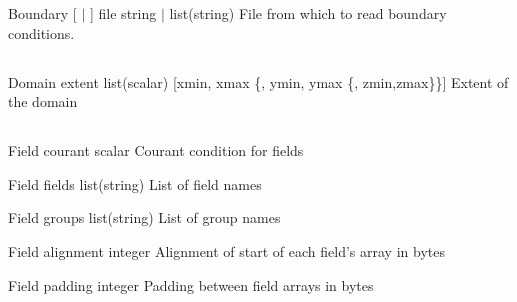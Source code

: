 \documentclass{book}
\begin{document}
\Parameter
{Boundary} 
{[  $|$  ]} 
{file} 
{string $|$ list(string)} 
{} 
{File from which to read boundary conditions.  } 
{} 
{}

\subsection{}

\Parameter
{Domain} 
{} 
{extent} 
{list(scalar)} 
{[xmin, xmax \{, ymin, ymax \{, zmin,zmax\}\}]}
{Extent of the domain} 
{} 
{}

\subsection{}

\Parameter
{Field} 
{} 
{courant} 
{scalar} 
{} 
{Courant condition for fields} 
{} 
{}

\Parameter
{Field} 
{} 
{fields} 
{list(string)} 
{} 
{List of field names} 
{} 
{}

\Parameter
{Field} 
{} 
{groups} 
{list(string)} 
{} 
{List of group names} 
{} 
{}

\Parameter
{Field}
{}
{alignment}
{integer}
{}
{Alignment of start of each field's array in bytes}
{}
{}

\Parameter
{Field}
{}
{padding}
{integer}
{}
{Padding between field arrays in bytes}
{}
{}
\end{document}

